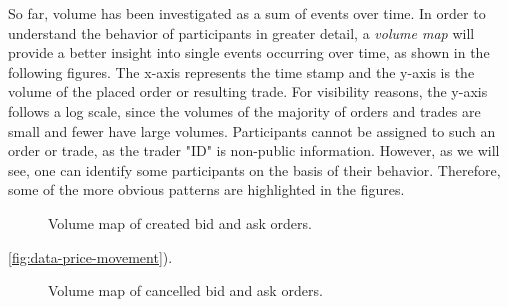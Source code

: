 So far, volume has been investigated as a sum of events over time.
In order to understand the behavior of participants in greater detail, a \textit{volume map} will provide a better insight into single events occurring over time, as shown in the following figures.
The x-axis represents the time stamp and the y-axis is the volume of the placed order or resulting trade.
For visibility reasons, the y-axis follows a log scale, since the volumes of the majority of orders and trades are small and fewer have large volumes.
Participants cannot be assigned to such an order or trade, as the trader "ID" is non-public information.
However, as we will see, one can identify some participants on the basis of their behavior.
Therefore, some of the more obvious patterns are highlighted in the figures.
\begin{figure}[H]
    \centering
    \caption{Volume map of created bid and ask orders.}
    \label{fig:data-volmap-crated}
\end{figure}
\ref{fig:data-price-movement}).
\begin{figure}[H]
    \centering
    \caption{Volume map of cancelled bid and ask orders.}
    \label{fig:data-volmap-cancelled}
\end{figure}
